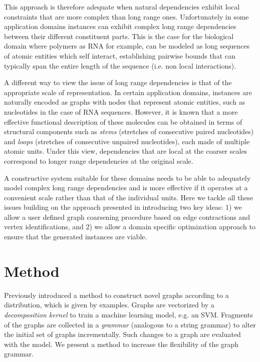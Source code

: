 \documentclass{article}
\begin{document}
This approach is therefore adequate when natural dependencies exhibit local
constraints that are more complex than long range ones.  Unfortunately in
some application domains instances can exhibit complex long range
dependencies between their different constituent parts. This is the case for
the biological domain where polymers as RNA for example, can be modeled as
long sequences of atomic entities which self interact, establishing pairwise
bounds that can typically span the entire length of the sequence (i.e. non
local interactions). 

A different way to view the issue of long range dependencies is that of the
appropriate scale of representation. In certain application domains, instances
are naturally encoded as graphs with nodes that represent atomic entities,
such as nucleotides in the case of RNA sequences. However, it is known that a
more effective functional description of these molecules can be obtained in
terms of structural components such as {\em stems} (stretches of consecutive
paired nucleotides) and {\em loops} (stretches of consecutive unpaired
nucleotides), each made of multiple atomic units. Under this view,
dependencies that are local at the coarser scales correspond to longer range
dependencies at the original scale.

A constructive system suitable for these domains needs to be able to
adequately model complex long range dependencies and is more effective if it
operates at a convenient scale rather than that of the individual units. Here we
tackle all these issues building on the approach presented in \cite{costa16}
introducing two key ideas: 1) we allow a user defined graph coarsening
procedure based on edge contractions and vertex identifications, and 2) we
allow a domain specific optimization approach to ensure that the generated
instances are viable.


\section{Method}

Previously \cite{costa16} introduced a method
to construct novel graphs according to a distribution, which is given by
examples. Graphs are vectorized by a \emph{decomposition kernel}
to train a machine learning model, e.g. an SVM.
Fragments of the graphs are collected in 
a \emph{grammar} (analogous to a string grammar) to alter the initial
set of graphs incrementally. Such changes to a graph are evaluated with the
model. 
We present a method to increase the flexibility of the graph grammar.
\end{document}
